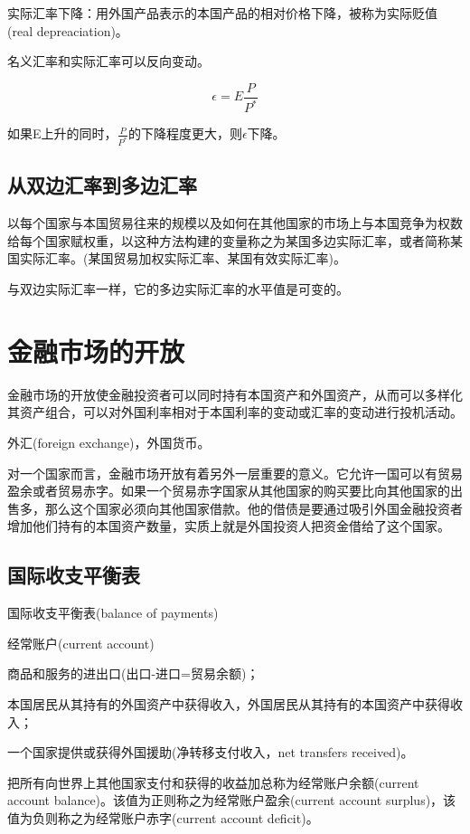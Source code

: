\documentclass{article}
\begin{document}
实际汇率下降：用外国产品表示的本国产品的相对价格下降，被称为实际贬值(real depreaciation)。

名义汇率和实际汇率可以反向变动。

\[
\epsilon=E\frac{{P}}{P^*}
\]

如果E上升的同时，$ \frac{P}{P^*} $的下降程度更大，则$ \epsilon $下降。

\subsection{从双边汇率到多边汇率}

以每个国家与本国贸易往来的规模以及如何在其他国家的市场上与本国竞争为权数给每个国家赋权重，以这种方法构建的变量称之为某国多边实际汇率，或者简称某国实际汇率。(某国贸易加权实际汇率、某国有效实际汇率)。

与双边实际汇率一样，它的多边实际汇率的水平值是可变的。

\section{金融市场的开放}

金融市场的开放使金融投资者可以同时持有本国资产和外国资产，从而可以多样化其资产组合，可以对外国利率相对于本国利率的变动或汇率的变动进行投机活动。

外汇(foreign exchange)，外国货币。

对一个国家而言，金融市场开放有着另外一层重要的意义。它允许一国可以有贸易盈余或者贸易赤字。如果一个贸易赤字国家从其他国家的购买要比向其他国家的出售多，那么这个国家必须向其他国家借款。他的借债是要通过吸引外国金融投资者增加他们持有的本国资产数量，实质上就是外国投资人把资金借给了这个国家。


\subsection{国际收支平衡表}

国际收支平衡表(balance of payments)

\hspace*{\fill}

经常账户(current account)

商品和服务的进出口(出口-进口=贸易余额)；

本国居民从其持有的外国资产中获得收入，外国居民从其持有的本国资产中获得收入；

一个国家提供或获得外国援助(净转移支付收入，net transfers received)。

把所有向世界上其他国家支付和获得的收益加总称为经常账户余额(current account balance)。该值为正则称之为经常账户盈余(current account surplus)，该值为负则称之为经常账户赤字(current account deficit)。
\end{document}
